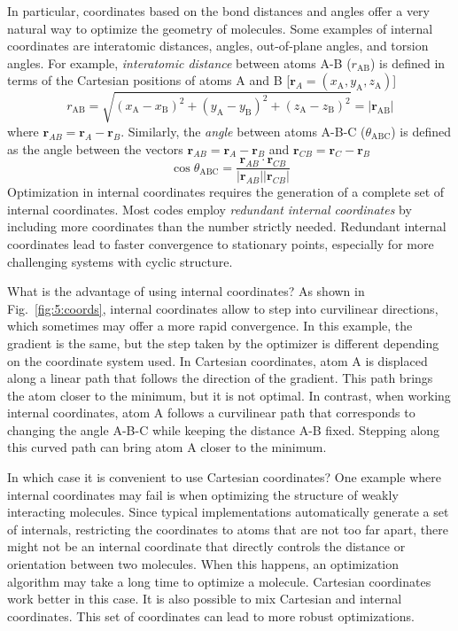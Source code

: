 \documentclass[../Main/chem371-notes.tex]{subfiles}
\begin{document}
In particular, coordinates based on the bond distances and angles offer a very natural way to optimize the geometry of molecules.
Some examples of internal coordinates are interatomic distances, angles, out-of-plane angles, and torsion angles.
For example, \emph{interatomic distance} between atoms A-B ($r_{\mathrm{AB}}$) is defined in terms of the Cartesian positions of atoms A and B [$\mathbf{r}_{A} = (x_\mathrm{A},y_\mathrm{A},z_\mathrm{A})$]
\begin{equation}
r_{\mathrm{AB}} =
\sqrt{
(x_\mathrm{A} - x_\mathrm{B})^2
+ (y_\mathrm{A} - y_\mathrm{B})^2
+ (z_\mathrm{A} - z_\mathrm{B})^2
}
= |\mathbf{r}_{\mathrm{AB}}|
\end{equation}
where $\mathbf{r}_{AB} = \mathbf{r}_{A} - \mathbf{r}_{B}$.
Similarly, the \emph{angle} between atoms A-B-C ($\theta_{\mathrm{ABC}}$) is defined as the angle between the vectors $\mathbf{r}_{AB} = \mathbf{r}_{A} - \mathbf{r}_{B}$ and $\mathbf{r}_{CB} = \mathbf{r}_{C} - \mathbf{r}_{B}$
\begin{equation}
\cos \theta_{\mathrm{ABC}}
= \frac{\mathbf{r}_{AB} \cdot \mathbf{r}_{CB}}
{|\mathbf{r}_{AB}||\mathbf{r}_{CB}|}
\end{equation}
Optimization in internal coordinates requires the generation of a complete set of internal coordinates.
Most codes employ \emph{redundant internal coordinates} by including more coordinates than the number strictly needed.
Redundant internal coordinates lead to faster convergence to stationary points, especially for more challenging systems with cyclic structure.

What is the advantage of using internal coordinates? As shown in Fig.~\ref{fig:5:coords}, internal coordinates allow to step into  curvilinear directions, which sometimes may offer a more rapid convergence.
In this example, the gradient is the same, but the step taken by the optimizer is different depending on the coordinate system used.
In Cartesian coordinates, atom A is displaced along a linear path that follows the direction of the gradient. This path brings the atom closer to the minimum, but it is not optimal.
In contrast, when working internal coordinates, atom A follows a curvilinear path that corresponds to changing the angle A-B-C while keeping the distance A-B fixed.
Stepping along this curved path can bring atom A closer to the minimum.

In which case it is convenient to use Cartesian coordinates?
One example where internal coordinates may fail is when optimizing the structure of weakly interacting molecules.
Since typical implementations automatically generate a set of internals, restricting the coordinates to atoms that are not too far apart, there might not be an internal coordinate that directly controls the distance or orientation between two molecules.
When this happens, an optimization algorithm may take a long time to optimize a molecule.
Cartesian coordinates work better in this case.
It is also possible to mix Cartesian and internal coordinates.
This set of coordinates can lead to more robust optimizations.
\end{document}
